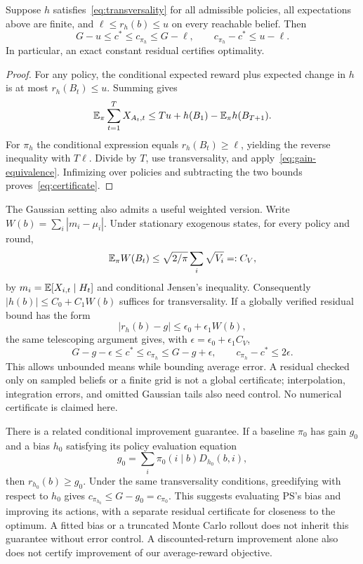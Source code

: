 \begin{proposition}
Suppose $h$ satisfies~\eqref{eq:transversality} for all admissible policies, all expectations above are finite, and
$\ell\leq r_h(b)\leq u$ on every reachable belief. Then
\begin{equation}
G-u\leq c^*\leq c_{\pi_h}\leq G-\ell,\qquad
c_{\pi_h}-c^*\leq u-\ell.
\label{eq:certificate}
\end{equation}
In particular, an exact constant residual certifies optimality.
\end{proposition}
\begin{proof}
For any policy, the conditional expected reward plus expected change in $h$ is at most $r_h(B_t)\leq u$. Summing gives
\[
\mathbb E_\pi\sum_{t=1}^TX_{A_t,t}\leq Tu+h(B_1)-\mathbb E_\pi h(B_{T+1}).
\]
For $\pi_h$ the conditional expression equals $r_h(B_t)\geq\ell$, yielding the reverse inequality with $T\ell$. Divide by $T$, use transversality, and apply~\eqref{eq:gain-equivalence}. Infimizing over policies and subtracting the two bounds proves~\eqref{eq:certificate}.
\end{proof}

The Gaussian setting also admits a useful weighted version. Write $W(b)=\sum_i|m_i-\mu_i|$. Under stationary exogenous states, for every policy and round,
\begin{equation}
\mathbb E_\pi W(B_t)\leq\sqrt{2/\pi}\sum_i\sqrt{V_i}=:C_V,
\label{eq:belief-moment}
\end{equation}
by $m_i=\mathbb E[X_{i,t}\mid H_t]$ and conditional Jensen's inequality. Consequently $|h(b)|\leq C_0+C_1W(b)$ suffices for transversality. If a globally verified residual bound has the form
\begin{equation}
|r_h(b)-g|\leq\epsilon_0+\epsilon_1W(b),
\end{equation}
the same telescoping argument gives, with $\epsilon=\epsilon_0+\epsilon_1C_V$,
\begin{equation}
G-g-\epsilon\leq c^*\leq c_{\pi_h}\leq G-g+\epsilon,
\qquad c_{\pi_h}-c^*\leq2\epsilon.
\end{equation}
This allows unbounded means while bounding average error. A residual checked only on sampled beliefs or a finite grid is not a global certificate; interpolation, integration errors, and omitted Gaussian tails also need control. No numerical certificate is claimed here.

There is a related conditional improvement guarantee. If a baseline $\pi_0$ has gain $g_0$ and a bias $h_0$ satisfying its policy evaluation equation
\[
g_0=\sum_i\pi_0(i\mid b)D_{h_0}(b,i),
\]
then $r_{h_0}(b)\geq g_0$. Under the same transversality conditions, greedifying with respect to $h_0$ gives $c_{\pi_{h_0}}\leq G-g_0=c_{\pi_0}$. This suggests evaluating PS's bias and improving its actions, with a separate residual certificate for closeness to the optimum. A fitted bias or a truncated Monte Carlo rollout does not inherit this guarantee without error control. A discounted-return improvement alone also does not certify improvement of our average-reward objective.

